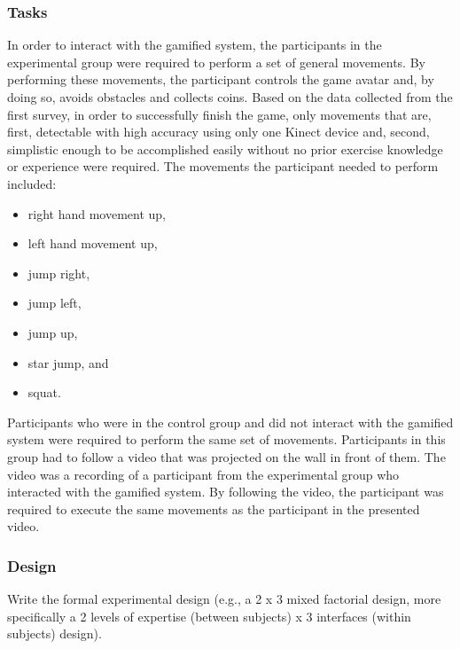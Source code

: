 \subsubsection{Tasks}
In order to interact with the gamified system, the participants in the experimental group were required to perform a set of general movements. By performing these movements, the participant controls the game avatar and, by doing so, avoids obstacles and collects coins. Based on the data collected from the first survey, in order to successfully finish the game, only movements that are, first, detectable with high accuracy using only one Kinect device and, second, simplistic enough to be accomplished easily without no prior exercise knowledge or experience were required. The movements the participant needed to perform included: 
\begin{itemize}
\item right hand movement up,
\item left hand movement up,
\item jump right,
\item jump left,
\item jump up, 
\item star jump, and
\item squat.
\end{itemize}
Participants who were in the control group and did not interact with the gamified system were required to perform the same set of movements. Participants in this group had to follow a video that was projected on the wall in front of them. The video was a recording of a participant from the experimental group who interacted with the gamified system. By following the video, the participant was required to execute the same movements as the participant in the presented video.

\subsubsection{Design}
Write the formal experimental design (e.g., a 2 x 3 mixed factorial design, more specifically a 2 levels of expertise (between subjects) x 3 interfaces (within subjects) design).
